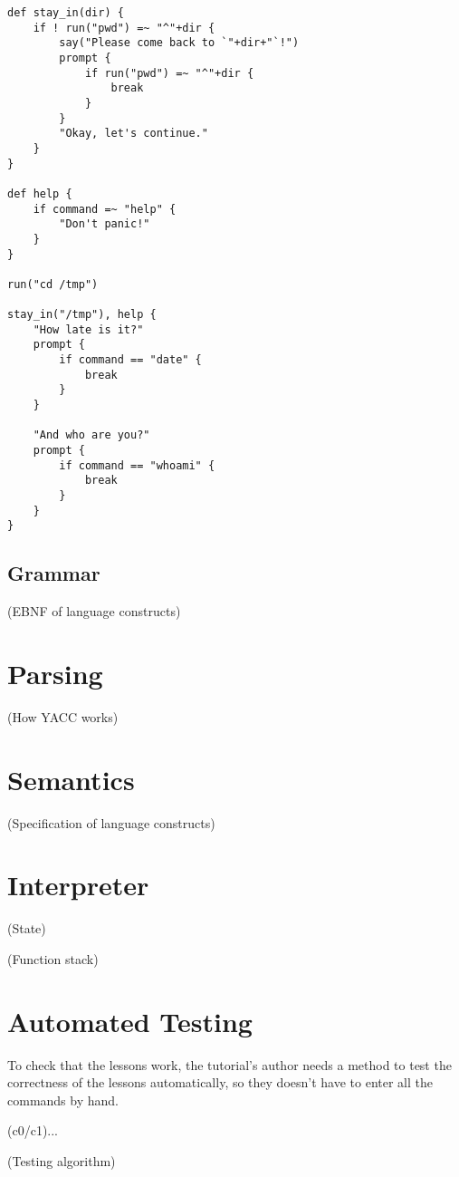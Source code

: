 \documentclass[twoside]{scrreprt}
\begin{document}
\begin{lstlisting}
def stay_in(dir) {
    if ! run("pwd") =~ "^"+dir {
        say("Please come back to `"+dir+"`!")
        prompt {
            if run("pwd") =~ "^"+dir {
                break
            }
        }
        "Okay, let's continue."
    }
}

def help {
    if command =~ "help" {
        "Don't panic!"
    }
}

run("cd /tmp")

stay_in("/tmp"), help {
    "How late is it?"
    prompt {
        if command == "date" {
            break
        }
    }

    "And who are you?"
    prompt {
        if command == "whoami" {
            break
        }
    }
}
\end{lstlisting}

\subsection{Grammar}

(EBNF of language constructs)

\section{Parsing}

(How YACC works)

\section{Semantics}

(Specification of language constructs)

\section{Interpreter}

(State)

(Function stack)

\section{Automated Testing}

To check that the lessons work, the tutorial's author needs a method to test the correctness of the lessons automatically, so they doesn't have to enter all the commands by hand.

(c0/c1)...

(Testing algorithm)
\end{document}
